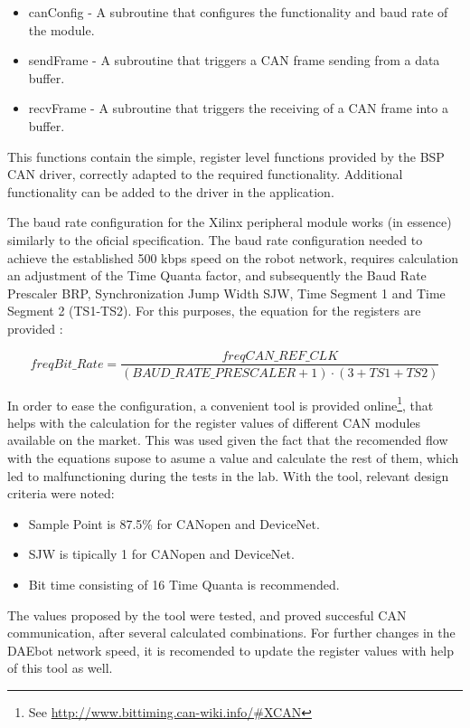 \begin{itemize}
	\item canConfig - A subroutine that configures the functionality and baud rate of the module.
	\item sendFrame - A subroutine that triggers a CAN frame sending from a data buffer.
	\item recvFrame - A subroutine that triggers the receiving of a CAN frame into a buffer.
\end{itemize}

This functions contain the simple, register level functions provided by the BSP CAN driver, correctly adapted to the required functionality. Additional functionality can be added to the driver in the application.

The baud rate configuration for the Xilinx peripheral module works (in essence) similarly to the oficial specification. The baud rate configuration needed to achieve the established 500 kbps speed on the robot network, requires calculation an adjustment of the Time Quanta factor, and subsequently the Baud Rate Prescaler BRP, Synchronization Jump Width SJW, Time Segment 1 and Time Segment 2 (TS1-TS2). For this purposes, the equation for the registers are provided \cite[p.~580]{UG585}:

\begin{equation}
	freqBit\_Rate = \frac{ freqCAN\_REF\_CLK }{ \left( BAUD\_RATE\_PRESCALER + 1 \right) \cdot \left( 3+TS1+TS2 \right) }
\end{equation}

In order to ease the configuration, a convenient tool is provided online\footnote{See \underline{http://www.bittiming.can-wiki.info/\#XCAN}}, that helps with the calculation for the register values of different CAN modules available on the market. This was used given the fact that the recomended flow with the equations supose to asume a value and calculate the rest of them, which led to malfunctioning during the tests in the lab. With the tool, relevant design criteria were noted:
\begin{itemize}
	\item Sample Point is 87.5\% for CANopen and DeviceNet.
	\item SJW is tipically 1 for CANopen and DeviceNet.
	\item Bit time consisting of 16 Time Quanta is recommended.
\end{itemize}

The values proposed by the tool were tested, and proved succesful CAN communication, after several calculated combinations. For further changes in the DAEbot network speed, it is recomended to update the register values with help of this tool as well.

